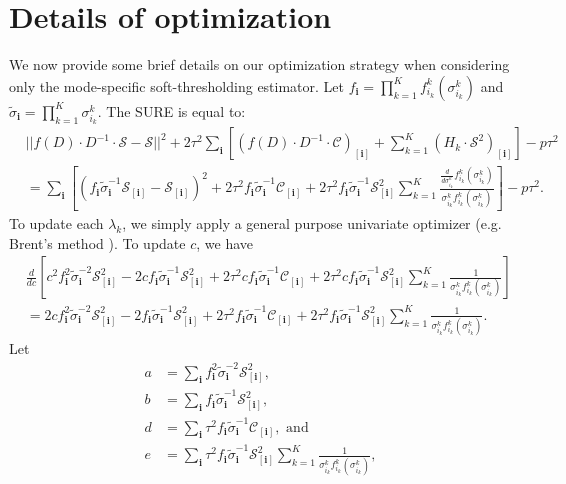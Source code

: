 \section{Details of optimization}
We now provide some brief details on our optimization strategy when considering only the mode-specific soft-thresholding estimator. Let
$f_{\mathbf{i}} = \prod_{k=1}^Kf_{i_k}^k(\sigma_{i_k}^k)$ and
$\tilde{\sigma}_{\mathbf{i}} = \prod_{k=1}^K\sigma_{i_k}^k$. The SURE
is equal to:
\begin{align}
  &||f(D) \cdot D ^{-1} \cdot \mathcal{S} - \mathcal{S}||^2 + 2\tau^2 \sum_{\mathbf{i}} \left[\left(f(D) \cdot D^{-1} \cdot \mathcal{C}\right)_{[\mathbf{i}]} + \sum_{k=1}^K \left(H_k \cdot \mathcal{S}^2\right)_{[\mathbf{i}]}\right] - p \tau^2\\
  & = \sum_{\mathbf{i}}\left[\left(f_{\mathbf{i}}\tilde{\sigma}^{-1}_{\mathbf{i}}\mathcal{S}_{[\mathbf{i}]} - \mathcal{S}_{[\mathbf{i}]}\right)^2 + 2\tau^2f_{\mathbf{i}}\tilde{\sigma}^{-1}_{\mathbf{i}}\mathcal{C}_{[\mathbf{i}]} + 2\tau^2f_{\mathbf{i}}\tilde{\sigma}^{-1}_{\mathbf{i}}\mathcal{S}_{[\mathbf{i}]}^2 \sum_{k=1}^K\frac{\frac{d}{d\sigma_{i_k}^k}f_{i_k}^k(\sigma_{i_k}^k)}{\sigma_{i_k}^kf_{i_k}^k(\sigma_{i_k}^k)}\right] - p\tau^2. \label{equation:sum.sure}
\end{align}
To update each $\lambda_k$, we simply apply a general purpose
univariate optimizer (e.g. Brent's method
\citep{brent1971algorithm}). To update $c$, we have
\begin{align*}
  &\frac{d}{dc}\left[c^2f_{\mathbf{i}}^2\tilde{\sigma}^{-2}_{\mathbf{i}}\mathcal{S}_{[\mathbf{i}]}^2 - 2 cf_{\mathbf{i}}\tilde{\sigma}^{-1}_{\mathbf{i}}\mathcal{S}_{[\mathbf{i}]}^2 + 2\tau^2cf_{\mathbf{i}}\tilde{\sigma}^{-1}_{\mathbf{i}}\mathcal{C}_{[\mathbf{i}]} + 2\tau^2cf_{\mathbf{i}}\tilde{\sigma}^{-1}_{\mathbf{i}}\mathcal{S}_{[\mathbf{i}]}^2 \sum_{k=1}^K\frac{1}{\sigma_{i_k}^kf_{i_k}^k(\sigma_{i_k}^k)}\right]\\
  &=2cf_{\mathbf{i}}^2\tilde{\sigma}^{-2}_{\mathbf{i}}\mathcal{S}_{[\mathbf{i}]}^2 - 2f_{\mathbf{i}}\tilde{\sigma}^{-1}_{\mathbf{i}}\mathcal{S}_{[\mathbf{i}]}^2 + 2\tau^2f_{\mathbf{i}}\tilde{\sigma}^{-1}_{\mathbf{i}}\mathcal{C}_{[\mathbf{i}]} + 2\tau^2f_{\mathbf{i}}\tilde{\sigma}^{-1}_{\mathbf{i}}\mathcal{S}_{[\mathbf{i}]}^2 \sum_{k=1}^K\frac{1}{\sigma_{i_k}^kf_{i_k}^k(\sigma_{i_k}^k)}.
\end{align*}
Let
\begin{align*}
  a &= \sum_{\mathbf{i}}f_{\mathbf{i}}^2\tilde{\sigma}^{-2}_{\mathbf{i}}\mathcal{S}_{[\mathbf{i}]}^2,\\
  b &= \sum_{\mathbf{i}}f_{\mathbf{i}}\tilde{\sigma}^{-1}_{\mathbf{i}}\mathcal{S}_{[\mathbf{i}]}^2,\\
  d &= \sum_{\mathbf{i}}\tau^2f_{\mathbf{i}}\tilde{\sigma}^{-1}_{\mathbf{i}}\mathcal{C}_{[\mathbf{i}]}, \text{ and}\\
  e &= \sum_{\mathbf{i}}\tau^2f_{\mathbf{i}}\tilde{\sigma}^{-1}_{\mathbf{i}}\mathcal{S}_{[\mathbf{i}]}^2 \sum_{k=1}^K\frac{1}{\sigma_{i_k}^kf_{i_k}^k(\sigma_{i_k}^k)},
\end{align*}
